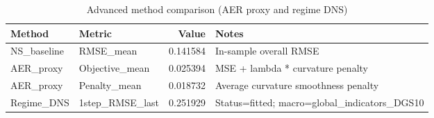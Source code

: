 \begin{table}
\caption{Advanced method comparison (AER proxy and regime DNS)}
\label{tab:6_4}
\begin{tabular}{llrl}
\toprule
Method & Metric & Value & Notes \\
\midrule
NS_baseline & RMSE_mean & 0.141584 & In-sample overall RMSE \\
AER_proxy & Objective_mean & 0.025394 & MSE + lambda * curvature penalty \\
AER_proxy & Penalty_mean & 0.018732 & Average curvature smoothness penalty \\
Regime_DNS & 1step_RMSE_last & 0.251929 & Status=fitted; macro=global_indicators_DGS10 \\
\bottomrule
\end{tabular}
\end{table}

